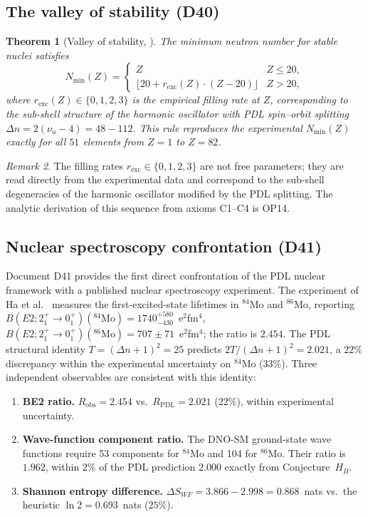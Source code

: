 \documentclass[11pt,a4paper]{article}
\theoremstyle{plain}
\newtheorem{theorem}{Theorem}[section]
\theoremstyle{definition}
\theoremstyle{remark}
\newtheorem{remark}[theorem]{Remark}
\begin{document}
\subsection{The valley of stability (D40)}
\label{subsec:valleystability}
\begin{theorem}[Valley of stability, \cite{D40}]
\label{thm:valley}
The minimum neutron number for stable nuclei satisfies
\[N_{\min}(Z)=\begin{cases} Z & Z\leq 20,\\[4pt] \lfloor 20+r_{\mathrm{exc}}(Z)\cdot(Z-20)\rfloor & Z>20,\end{cases}\]
where $r_{\mathrm{exc}}(Z)\in\{0,1,2,3\}$ is the empirical filling rate at $Z$, corresponding to the sub-shell structure of the harmonic oscillator with PDL spin--orbit splitting $\Delta n=2(\nu_u-4)=48-112$. This rule reproduces the experimental $N_{\min}(Z)$ exactly for all $51$ elements from $Z=1$ to $Z=82$.
\end{theorem}

\begin{remark}
The filling rates $r_{\mathrm{exc}}\in\{0,1,2,3\}$ are not free parameters; they are read directly from the experimental data and correspond to the sub-shell degeneracies of the harmonic oscillator modified by the PDL splitting. The analytic derivation of this sequence from axioms C1--C4 is OP14.
\end{remark}

\subsection{Nuclear spectroscopy confrontation (D41)}
\label{subsec:d41}
Document D41 provides the first direct confrontation of the PDL nuclear framework with a published nuclear spectroscopy experiment. The experiment of Ha et al.~\cite{Ha2025} measures the first-excited-state lifetimes in $^{84}$Mo and $^{86}$Mo, reporting $B(E2;2^+_1\!\to\!0^+_1)(^{84}\mathrm{Mo})=1740{}^{+580}_{-430}$~e$^2$fm$^4$, $B(E2;2^+_1\!\to\!0^+_1)(^{86}\mathrm{Mo})=707\pm71$~e$^2$fm$^4$; the ratio is $2.454$. The PDL structural identity $T=(\Delta n+1)^2=25$ predicts $2T/(\Delta n+1)^2=2.021$, a $22\%$ discrepancy within the experimental uncertainty on $^{84}$Mo ($33\%$). Three independent observables are consistent with this identity:
\begin{enumerate}
\item \textbf{BE2 ratio.} $R_{\mathrm{obs}}=2.454$ vs.\ $R_{\mathrm{PDL}}=2.021$ ($22\%$), within experimental uncertainty.
\item \textbf{Wave-function component ratio.} The DNO-SM ground-state wave functions require 53 components for $^{84}$Mo and 104 for $^{86}$Mo. Their ratio is $1.962$, within $2\%$ of the PDL prediction $2.000$ exactly from Conjecture~$H_B$.
\item \textbf{Shannon entropy difference.} $\Delta S_{WF}=3.866-2.998=0.868$~nats vs.\ the heuristic $\ln 2=0.693$~nats ($25\%$).
\end{enumerate}
\end{document}
